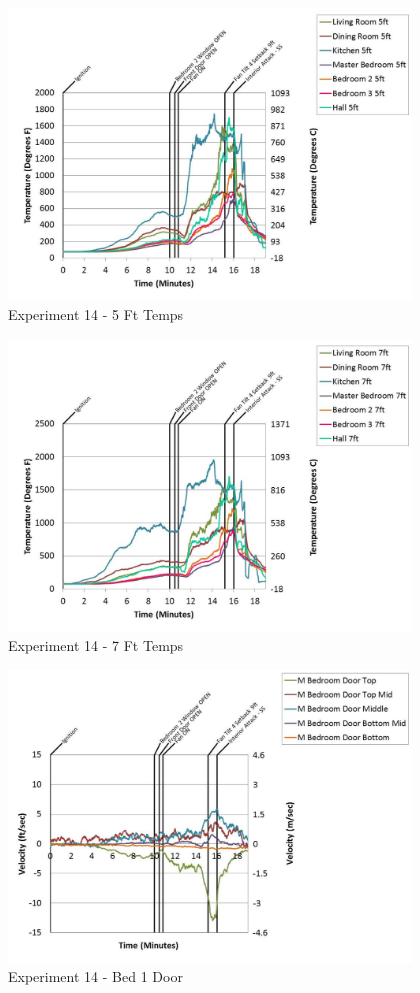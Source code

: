 \documentclass{article}
\begin{document}
\begin{appendices}
	\begin{figure}[h!]
		\centering
		\includegraphics[height=3.05in]{0_Images/Results_Charts/Exp_14_Charts/5FtTemps.pdf}
		\caption{Experiment 14 - 5 Ft Temps}
	\end{figure}
 

	\begin{figure}[h!]
		\centering
		\includegraphics[height=3.05in]{0_Images/Results_Charts/Exp_14_Charts/7FtTemps.pdf}
		\caption{Experiment 14 - 7 Ft Temps}
	\end{figure}
 
	\clearpage

	\begin{figure}[h!]
		\centering
		\includegraphics[height=3.05in]{0_Images/Results_Charts/Exp_14_Charts/Bed1Door.pdf}
		\caption{Experiment 14 - Bed 1 Door}
	\end{figure}
 


\end{appendices}
\end{document}
